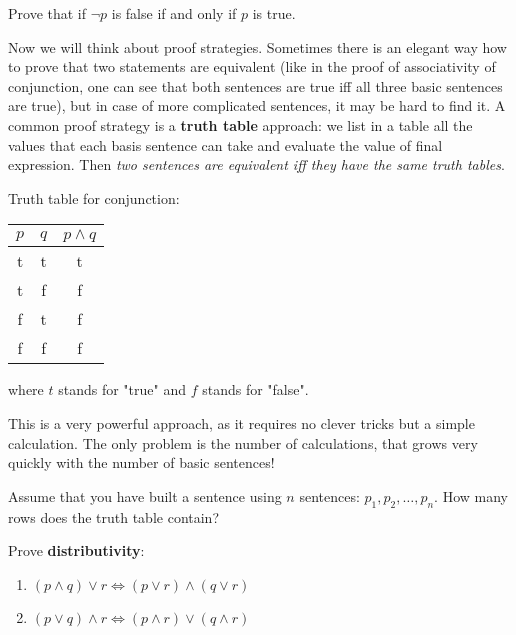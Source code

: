\begin{exercise}
  Prove that if $\neg p$ is false if and only if $p$ is true.
\end{exercise}

Now we will think about proof strategies. Sometimes there is an elegant way how to prove that two statements are equivalent (like in the proof of associativity of
conjunction, one can see that both sentences are true iff all three basic sentences are true), but in case of more complicated sentences, it may be hard to find it. A common
proof strategy is a \textbf{truth table} approach: we list in a table all the values that each basis sentence can take and evaluate the value of final expression.
Then \textit{two sentences are equivalent iff they have the same truth tables}.

\begin{example}
  Truth table for conjunction:\\
  \begin{center}
    \begin{tabular}{ c  c  c }
      $p$ & $q$ & $p\wedge q$ \\
      \hline
      t  &  t &        t     \\
      t  &  f &        f     \\
      f  &  t &        f     \\
      f  &  f &        f     \\
    \end{tabular}
  \end{center}
  where $t$ stands for "true" and $f$ stands for "false".
\end{example}

This is a very powerful approach, as it requires no clever tricks but a simple calculation. The only problem is the number of calculations, that grows very quickly with
the number of basic sentences!

\begin{exercise}
  Assume that you have built a sentence using $n$ sentences: $p_1, p_2, \dots, p_n$. How many rows does the truth table contain?
\end{exercise}

\begin{exercise}
  Prove \textbf{distributivity}:
  \begin{enumerate}
    \item $(p\wedge q)\vee r \Leftrightarrow (p\vee r) \wedge (q\vee r)$
    \item $(p\vee q)\wedge r \Leftrightarrow (p\wedge r) \vee (q\wedge r)$
  \end{enumerate}
\end{exercise}

